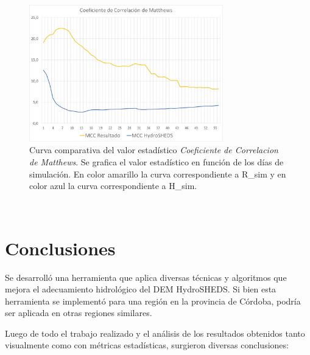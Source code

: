 \documentclass[10pt,a4paper, twoside]{report}
\begin{document}
\begin{figure}[H]
   \centering      
   \includegraphics[width=0.75\textwidth]{imagenes/MCC.jpg}
 \caption{Curva comparativa del valor estadístico \textit{Coeficiente de Correlacion de Matthews}. Se grafica el valor estadístico en función de los días de simulación. En color amarillo la curva correspondiente a R\_sim y en color azul la curva correspondiente a H\_sim.}
 \label{MCC}
\end{figure}


\newpage
$\ $
\thispagestyle{empty} %

\chapter{Conclusiones}
\label{chap:conclusiones}

Se desarrolló una herramienta que aplica diversas técnicas y algoritmos que mejora el adecuamiento hidrológico del DEM HydroSHEDS. Si bien esta herramienta se implementó para una región en la provincia de Córdoba, podría ser aplicada en otras regiones similares.

Luego de todo el trabajo realizado y el análisis de los resultados obtenidos tanto visualmente como con métricas estadísticas, surgieron diversas conclusiones:
\end{document}
